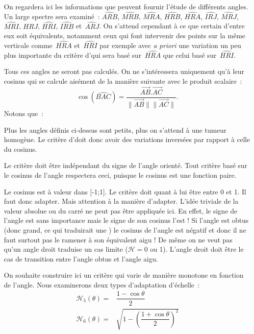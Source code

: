 \documentclass[main.tex]{subfiles}
\begin{document}
On regardera ici les informations que peuvent fournir l'étude de différents angles. Un large spectre sera examiné~: $\widehat{ARB}$, $\widehat{MRB}$, $\widehat{MRA}$,  $\widehat{HRB}$, $\widehat{HRA}$, $\widehat{IRJ}$, $\widehat{MRJ}$, $\widehat{MRI}$, $\widehat{HRJ}$, $\widehat{HRI}$, $\widehat{IRB}$ et~$\widehat{ARJ}$. 
On s'attend cependant à ce que certain d'entre eux soit équivalents, notamment ceux qui font intervenir des points sur la même verticale comme~$\widehat{HRA}$ et~$\widehat{HRI}$ par exemple avec \textit{a priori} une variation un peu plus importante du critère d'\hetero qui sera basé sur~$\widehat{HRA}$ que celui basé sur~$\widehat{HRI}$.

Tous ces angles ne seront pas calculés. On ne s'intéressera uniquement qu'à leur cosinus qui se calcule aisément de la manière suivante avec le produit scalaire~:
\begin{equation}
\label{eq:cos_prod_scal}
\cos(\widehat{BAC}) = \dfrac{ \overrightarrow{AB}.\overrightarrow{AC} }{ \| \overrightarrow{AB} \| \| \overrightarrow{AC} \|}.
\end{equation}
Notons que~:
\begin{myitemize}
\item Plus les angles définis ci-dessus sont petits, plus on s'attend à une tumeur homogène. Le critère d'\hetero doit donc avoir des variations inversées par rapport à celle du cosinus.
\item Le critère doit être indépendant du signe de l'angle orienté. Tout critère basé sur le cosinus de l'angle respectera ceci, puisque le cosinus est une fonction paire.
\item Le cosinus est à valeur dans [-1;1]. Le critère doit quant à lui être entre 0 et 1. Il faut donc adapter. Mais attention à la manière d'adapter. L'idée triviale de la valeur absolue ou du carré ne peut pas être appliquée ici. En effet, le signe de l'angle est sans importance mais le signe de son cosinus l'est ! Si l'angle est obtus (donc grand, ce qui traduirait une \hetero) le cosinus de l'angle est négatif et donc il ne faut surtout pas le ramener à son équivalent aigu ! De même on ne veut pas qu'un angle droit traduise un cas limite ($\mathcal{H} = 0$ ou 1). L'angle droit doit être le cas de transition entre l'angle obtus et l'angle aigu.
\end{myitemize}
On souhaite construire ici un critère qui varie de manière monotone en fonction de l'angle. Nous examinerons deux types d'adaptation d'échelle~:
\begin{align}
\mathcal{H}_5 (\theta) = &\dfrac{1-\cos \theta}{2} \\
\mathcal{H}_6 (\theta) = &\sqrt{1-\left(  \dfrac{1+\cos \theta}{2}\right)^2}
\end{align}
\end{document}
